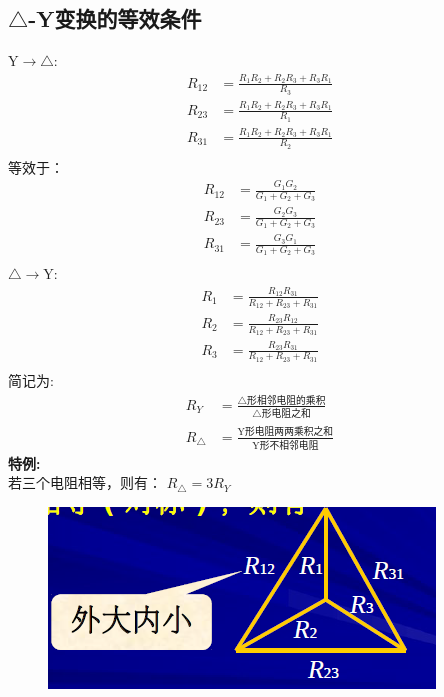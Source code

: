 \documentclass[11pt,a4paper,oneside]{book}
\begin{document}
\subsection{$\triangle$-Y变换的等效条件}
\noindent Y$\rightarrow$$\triangle$:
\begin{equation}
	\begin{aligned}
		R_{12}&=\frac{R_1R_2+R_2R_3+R_3R_1}{R_3} \\[6pt]
		R_{23}&=\frac{R_1R_2+R_2R_3+R_3R_1}{R_1} \\[6pt]
		R_{31}&=\frac{R_1R_2+R_2R_3+R_3R_1}{R_2} \\
	\end{aligned}
\end{equation}
等效于：
\begin{equation}
	\begin{aligned}
		R_{12}&=\frac{G_1G_2}{G_1+G_2+G_3} \\[6pt]
		R_{23}&=\frac{G_2G_3}{G_1+G_2+G_3} \\[6pt]
		R_{31}&=\frac{G_3G_1}{G_1+G_2+G_3} \\[6pt]
	\end{aligned}
\end{equation}
$\triangle$$\rightarrow$Y:
\begin{equation}
	\begin{aligned}
		R_1&=\frac{R_{12}R_{31}}{R_{12}+R_{23}+R_{31}} \\[6pt]
		R_2&=\frac{R_{23}R_{12}}{R_{12}+R_{23}+R_{31}} \\[6pt]
		R_3&=\frac{R_{23}R_{31}}{R_{12}+R_{23}+R_{31}} \\
	\end{aligned}
\end{equation}
简记为:
\begin{equation}
	\begin{aligned}
		R_Y&=\frac{\triangle\mbox{形相邻电阻的乘积}}{\triangle \mbox{形电阻之和}} \\
		R_\triangle&=\frac{\mbox{Y形电阻两两乘积之和}}{\mbox{Y形不相邻电阻}}
	\end{aligned}
\end{equation}
\noindent\textbf{特例:}
~\\
若三个电阻相等，则有：
$R_\triangle=3R_Y$
\begin{figure}[H]
	\centering
	\includegraphics[width=0.4\linewidth]{screenshot007}
	\caption{}
	\label{fig:screenshot007}
\end{figure}
\end{document}
